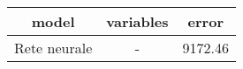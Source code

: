 \begin{table}[tb]
\centering
\begin{tabular}{| c | c | c }
  \hline
model & variables & error \\ 
  \hline
Rete neurale & - & 9172.46 \\ 
   \hline
\end{tabular}
\caption{} 
\label{}
\end{table}
